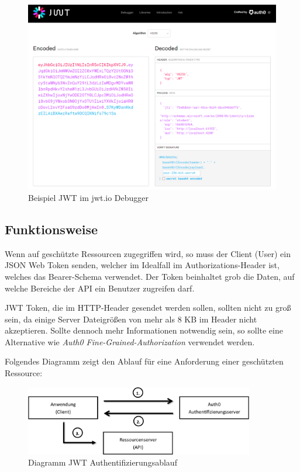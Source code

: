 \begin{figure}
    \begin{center}
        \includegraphics*[width=15cm]{./pics/screenshot-JWT-token1.png}
        \caption[Bsp JWT in Debugger]{Beispiel JWT im jwt.io Debugger}
    \end{center}
\end{figure}

\subsection{Funktionsweise}
Wenn auf geschützte Ressourcen zugegriffen wird, so muss der Client (User) ein JSON Web Token senden, 
welcher im Idealfall im Authorizations-Header ist, welches das Bearer-Schema verwendet. 
Der Token beinhaltet grob die Daten, auf welche Bereiche der API ein Benutzer zugreifen darf. 

JWT Token, die im HTTP-Header gesendet werden sollen, sollten nicht zu groß sein, da einige Server Dateigrößen von mehr als 8 KB im Header nicht akzeptieren.
Sollte dennoch mehr Informationen notwendig sein, so sollte eine Alternative wie \textit{Auth0 Fine-Grained-Authorization} verwendet werden.

Folgendes Diagramm zeigt den Ablauf für eine Anforderung einer geschützten Ressource:

\begin{figure}
    \begin{center}
        \includegraphics*[width=10cm]{./pics/Ablauf-JWT-Auth.png}
        \caption[Ablauf JWT Authentifizierung]{Diagramm JWT Authentifizierungsablauf}
    \end{center}
\end{figure}
    
